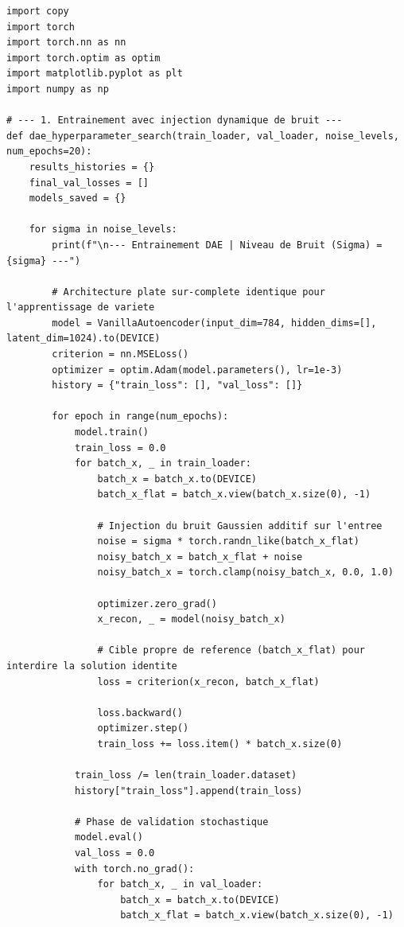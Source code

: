 \documentclass[11pt,a4paper]{report}
\begin{document}
\begin{lstlisting}[caption=Pipeline d'exploration et d'analyse de robustesse du DAE]
import copy
import torch
import torch.nn as nn
import torch.optim as optim
import matplotlib.pyplot as plt
import numpy as np

# --- 1. Entrainement avec injection dynamique de bruit ---
def dae_hyperparameter_search(train_loader, val_loader, noise_levels, num_epochs=20):
    results_histories = {}
    final_val_losses = []
    models_saved = {}
    
    for sigma in noise_levels:
        print(f"\n--- Entrainement DAE | Niveau de Bruit (Sigma) = {sigma} ---")
        
        # Architecture plate sur-complete identique pour l'apprentissage de variete
        model = VanillaAutoencoder(input_dim=784, hidden_dims=[], latent_dim=1024).to(DEVICE)
        criterion = nn.MSELoss()
        optimizer = optim.Adam(model.parameters(), lr=1e-3)
        history = {"train_loss": [], "val_loss": []}
        
        for epoch in range(num_epochs):
            model.train()
            train_loss = 0.0
            for batch_x, _ in train_loader:
                batch_x = batch_x.to(DEVICE)
                batch_x_flat = batch_x.view(batch_x.size(0), -1)
                
                # Injection du bruit Gaussien additif sur l'entree
                noise = sigma * torch.randn_like(batch_x_flat)
                noisy_batch_x = batch_x_flat + noise
                noisy_batch_x = torch.clamp(noisy_batch_x, 0.0, 1.0)
                
                optimizer.zero_grad()
                x_recon, _ = model(noisy_batch_x) 
                
                # Cible propre de reference (batch_x_flat) pour interdire la solution identite
                loss = criterion(x_recon, batch_x_flat)
                
                loss.backward()
                optimizer.step()
                train_loss += loss.item() * batch_x.size(0) 
                
            train_loss /= len(train_loader.dataset)
            history["train_loss"].append(train_loss)
            
            # Phase de validation stochastique
            model.eval()
            val_loss = 0.0
            with torch.no_grad():
                for batch_x, _ in val_loader:
                    batch_x = batch_x.to(DEVICE)
                    batch_x_flat = batch_x.view(batch_x.size(0), -1)
                    

\end{lstlisting}
\end{document}
